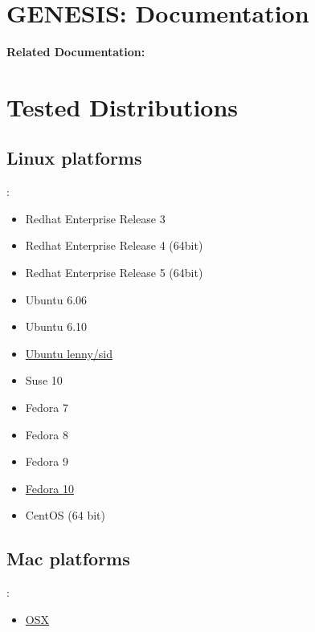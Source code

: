 \documentclass[12pt]{article}
\begin{document}
\section*{GENESIS: Documentation}

{\bf Related Documentation:}

\section*{Tested Distributions}

\subsection*{Linux platforms}:

\begin{itemize}
\item Redhat Enterprise Release 3
\item Redhat Enterprise Release 4 (64bit)
\item Redhat Enterprise Release 5 (64bit)
\item Ubuntu 6.06
\item Ubuntu 6.10
\item \href{../tested-lenny-sid/tested-lenny-sid.tex}{Ubuntu lenny/sid}
\item Suse 10
\item Fedora 7
\item Fedora 8
\item Fedora 9
\item \href{../tested-fedora10/tested-fedora10.tex}{Fedora 10}
\item CentOS (64 bit)%
\end{itemize}

\subsection*{Mac platforms}:

\begin{itemize}
\item \href{../installation-osx/installation-osx.tex}{OSX}
\end{itemize}
\end{document}
